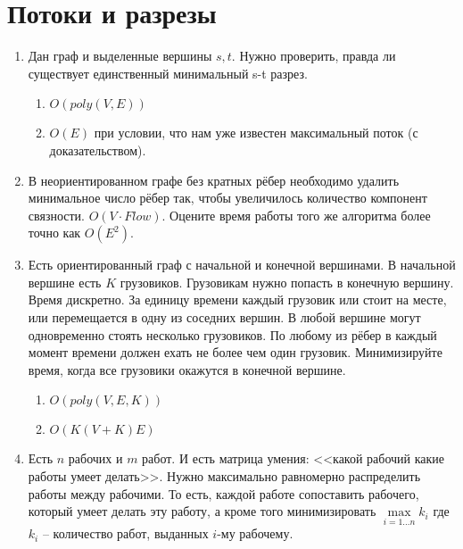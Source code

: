 \section*{Потоки и разрезы}
\begin{enumerate}
	\item Дан граф и выделенные вершины $s, t$. Нужно проверить, правда ли существует единственный минимальный s-t разрез.
	\begin{enumerate}
		\item $O(poly(V, E))$
		\item $O(E)$ при условии, что нам уже известен максимальный поток (с доказательством).
	\end{enumerate}
	
	\item В неориентированном графе без кратных рёбер необходимо удалить минимальное число рёбер так, чтобы увеличилось количество компонент связности. $O(V · Flow)$. Оцените время работы	того же алгоритма более точно как $O(E^2)$.
	
	\item Есть ориентированный граф с начальной и конечной вершинами. В начальной вершине есть $K$ грузовиков. Грузовикам нужно попасть в конечную вершину. Время дискретно. За единицу времени каждый грузовик или стоит на месте, или перемещается в одну из соседних вершин. В любой вершине могут одновременно стоять несколько грузовиков. По любому из рёбер в каждый момент времени должен ехать не более чем один грузовик. Минимизируйте время, когда все грузовики окажутся в конечной вершине.
	\begin{enumerate}
		\item $O(poly(V, E, K))$
		\item $O(K(V + K)E)$
	\end{enumerate}
	
	\item Есть $n$ рабочих и $m$ работ. И есть матрица умения: <<какой рабочий какие работы умеет делать>>. Нужно максимально равномерно распределить работы между рабочими. То есть, каждой работе сопоставить рабочего, который умеет делать эту работу, а кроме того минимизировать $\max\limits_{i=1\dots n} k_i$ где $k_i$ – количество работ, выданных $i$-му рабочему.
\end{enumerate}



